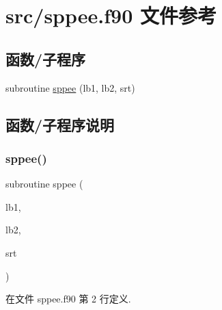 \hypertarget{sppee_8f90}{}\section{src/sppee.f90 文件参考}
\label{sppee_8f90}
\subsection*{函数/子程序}
\begin{DoxyCompactItemize}
\item 
subroutine \mbox{\hyperlink{sppee_8f90_ac17982647426c7100b066b97810790e2}{sppee}} (lb1, lb2, srt)
\end{DoxyCompactItemize}


\subsection{函数/子程序说明}
\mbox{\label{sppee_8f90_ac17982647426c7100b066b97810790e2}} 
\subsubsection{\texorpdfstring{sppee()}{sppee()}}
{\footnotesize\ttfamily subroutine sppee (\begin{DoxyParamCaption}\item[{}]{lb1,  }\item[{}]{lb2,  }\item[{}]{srt }\end{DoxyParamCaption})}



在文件 sppee.\+f90 第 2 行定义.

